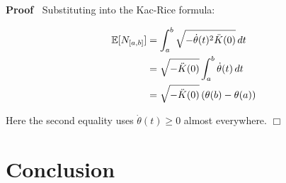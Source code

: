 \documentclass{article}
\newenvironment{proof}{\noindent\textbf{Proof\ }}{\hspace*{\fill}$\Box$\medskip}
\begin{document}
\begin{proof}
  Substituting into the Kac-Rice formula:
  
  \begin{align}
    \mathbb{E} [N_{[a, b]}] & = \int_a^b \sqrt{- \dot{\theta} (t)^2  \ddot{K}
    (0)}  \hspace{0.17em} dt \\
    & = \sqrt{- \ddot{K} (0)}  \int_a^b \dot{\theta} (t)  \hspace{0.17em} dt
    \\
    & = \sqrt{- \ddot{K} (0)}  \hspace{0.17em} (\theta (b) - \theta (a)) 
  \end{align}
  
  Here the second equality uses $\dot{\theta} (t) \geq 0$ almost everywhere.
\end{proof}

\section{Conclusion}\label{sec:conclusion}
\end{document}
